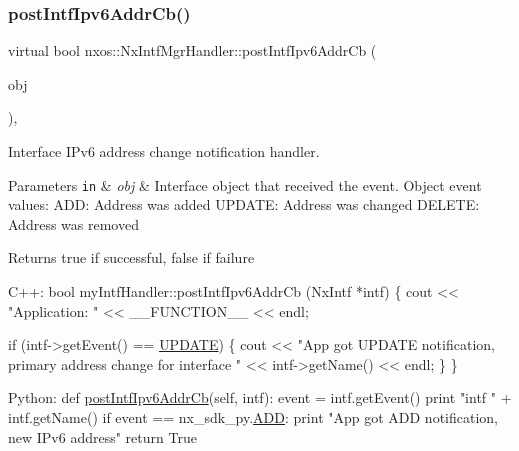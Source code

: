 \subsubsection{\texorpdfstring{post\+Intf\+Ipv6\+Addr\+Cb()}{postIntfIpv6AddrCb()}}
{\footnotesize\ttfamily virtual bool nxos\+::\+Nx\+Intf\+Mgr\+Handler\+::post\+Intf\+Ipv6\+Addr\+Cb (\begin{DoxyParamCaption}\item[{\mbox{\hyperlink{classnxos_1_1_nx_intf}{Nx\+Intf}} $\ast$}]{obj }\end{DoxyParamCaption})\hspace{0.3cm}{\ttfamily [inline]}, {\ttfamily [virtual]}}

Interface I\+Pv6 address change notification handler. 
\begin{DoxyParams}[1]{Parameters}
\mbox{\tt in}  & {\em obj} & Interface object that received the event. Object event values\+: A\+DD\+: Address was added U\+P\+D\+A\+TE\+: Address was changed D\+E\+L\+E\+TE\+: Address was removed \\
\hline
\end{DoxyParams}
\begin{DoxyReturn}{Returns}
true if successful, false if failure
\end{DoxyReturn}

\begin{DoxyCode}
C++:
     \textcolor{keywordtype}{bool}
     myIntfHandler::postIntfIpv6AddrCb (NxIntf *intf)
     \{
        cout << \textcolor{stringliteral}{"Application: "} << \_\_FUNCTION\_\_ << endl;

        \textcolor{keywordflow}{if} (intf->getEvent() == \mbox{\hyperlink{nx__common_8h_af9a9040b7681199d386e94eb888018cba4f3a5ababd9a5356d642a492f5ccc371}{UPDATE}}) \{
          cout << \textcolor{stringliteral}{"App got UPDATE notification, primary address change}
\textcolor{stringliteral}{                   for interface "} <<  intf->getName() << endl;
        \}
     \}

Python:   
     def \mbox{\hyperlink{classnxos_1_1_nx_intf_mgr_handler_ad845ed26b457bc0bdc7a9c79a94acdaf}{postIntfIpv6AddrCb}}(\textcolor{keyword}{self}, intf):
         event = intf.getEvent()
         print \textcolor{stringliteral}{"intf "} + intf.getName()
         if event == nx\_sdk\_py.\mbox{\hyperlink{nx__common_8h_af9a9040b7681199d386e94eb888018cba93d8c810253e44a0fd5f3d8d26032ad5}{ADD}}:
            print \textcolor{stringliteral}{"App got ADD notification, new IPv6 address"}
         return True
\end{DoxyCode}



